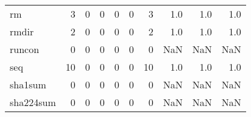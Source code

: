 \begin{tabular}{lrrrrrrrrr}
rm        &                                       3 &                                                  0 &                                                  0 &                                                  0 &                                                  0 &                                                  3 &                                                1.0 &                                    1.0 &                                  1.0 \\
rmdir     &                                       2 &                                                  0 &                                                  0 &                                                  0 &                                                  0 &                                                  2 &                                                1.0 &                                    1.0 &                                  1.0 \\
runcon    &                                       0 &                                                  0 &                                                  0 &                                                  0 &                                                  0 &                                                  0 &                                                NaN &                                    NaN &                                  NaN \\
seq       &                                      10 &                                                  0 &                                                  0 &                                                  0 &                                                  0 &                                                 10 &                                                1.0 &                                    1.0 &                                  1.0 \\
sha1sum   &                                       0 &                                                  0 &                                                  0 &                                                  0 &                                                  0 &                                                  0 &                                                NaN &                                    NaN &                                  NaN \\
sha224sum &                                       0 &                                                  0 &                                                  0 &                                                  0 &                                                  0 &                                                  0 &                                                NaN &                                    NaN &                                  NaN \\

\end{tabular}
